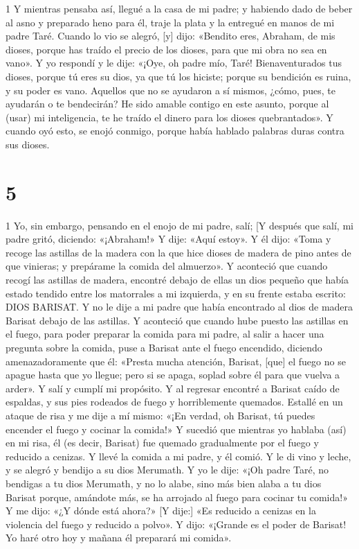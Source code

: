 \par 1 Y mientras pensaba así, llegué a la casa de mi padre; y habiendo dado de beber al asno y preparado heno para él, traje la plata y la entregué en manos de mi padre Taré. Cuando lo vio se alegró, [y] dijo: «Bendito eres, Abraham, de mis dioses, porque has traído el precio de los dioses, para que mi obra no sea en vano». Y yo respondí y le dije: «¡Oye, oh padre mío, Taré! Bienaventurados tus dioses, porque tú eres su dios, ya que tú los hiciste; porque su bendición es ruina, y su poder es vano. Aquellos que no se ayudaron a sí mismos, ¿cómo, pues, te ayudarán o te bendecirán? He sido amable contigo en este asunto, porque al (usar) mi inteligencia, te he traído el dinero para los dioses quebrantados». Y cuando oyó esto, se enojó conmigo, porque había hablado palabras duras contra sus dioses.

\chapter{5}

\par 1 Yo, sin embargo, pensando en el enojo de mi padre, salí; [Y después que salí, mi padre gritó, diciendo: «¡Abraham!» Y dije: «Aquí estoy». Y él dijo: «Toma y recoge las astillas de la madera con la que hice dioses de madera de pino antes de que vinieras; y prepárame la comida del almuerzo». Y aconteció que cuando recogí las astillas de madera, encontré debajo de ellas un dios pequeño que había estado tendido entre los matorrales a mi izquierda, y en su frente estaba escrito: DIOS BARISAT. Y no le dije a mi padre que había encontrado al dios de madera Barisat debajo de las astillas. Y aconteció que cuando hube puesto las astillas en el fuego, para poder preparar la comida para mi padre, al salir a hacer una pregunta sobre la comida, puse a Barisat ante el fuego encendido, diciendo amenazadoramente que él: «Presta mucha atención, Barisat, [que] el fuego no se apague hasta que yo llegue; pero si se apaga, soplad sobre él para que vuelva a arder». Y salí y cumplí mi propósito. Y al regresar encontré a Barisat caído de espaldas, y sus pies rodeados de fuego y horriblemente quemados. Estallé en un ataque de risa y me dije a mí mismo: «¡En verdad, oh Barisat, tú puedes encender el fuego y cocinar la comida!» Y sucedió que mientras yo hablaba (así) en mi risa, él (es decir, Barisat) fue quemado gradualmente por el fuego y reducido a cenizas. Y llevé la comida a mi padre, y él comió. Y le di vino y leche, y se alegró y bendijo a su dios Merumath. Y yo le dije: «¡Oh padre Taré, no bendigas a tu dios Merumath, y no lo alabe, sino más bien alaba a tu dios Barisat porque, amándote más, se ha arrojado al fuego para cocinar tu comida!» Y me dijo: «¿Y dónde está ahora?» [Y dije:] «Es reducido a cenizas en la violencia del fuego y reducido a polvo». Y dijo: «¡Grande es el poder de Barisat! Yo haré otro hoy y mañana él preparará mi comida».

